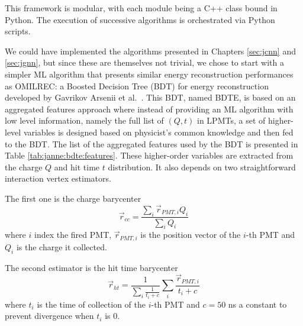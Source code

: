\documentclass[../main.tex]{subfiles}
\begin{document}
This framework is modular, with each module being a C++ class bound in Python. The execution of successive algorithms is orchestrated via Python scripts.


We could have implemented the algorithms presented in Chapters \ref{sec:jcnn} and \ref{sec:jgnn}, but since these are themselves not trivial, we chose to start with a simpler ML algorithm that presents similar energy reconstruction performances as OMILREC: a Boosted Decision Tree (BDT) for energy reconstruction developed by Gavrikov Arsenii et al.\ \cite{gavrikov_energy_2022}.
This BDT, named BDTE, is based on an aggregated features approach where instead of providing an ML algorithm with low level information, namely the full list of $(Q,t)$ in LPMTs, a set of higher-level variables is designed based on physicist's common knowledge and then fed to the BDT. The list of the aggregated features used by the BDT is presented in Table \ref{tab:janne:bdte:features}. These higher-order variables are extracted from the charge $Q$ and hit time $t$ distribution. It also depends on two straightforward interaction vertex estimators.


The first one is the charge barycenter
\begin{equation}
  \label{eq:janne:bdte:cc}
  \vec{r}_{cc} = \frac{\sum_i \vec{r}_{PMT,i} Q_i}{\sum_i Q_i}
\end{equation}
where $i$ index the fired PMT, $\vec{r}_{PMT, i}$ is the position vector of the $i$-th PMT and $Q_i$ is the charge it collected.

The second estimator is the hit time barycenter
\begin{equation}
  \label{eq:janne:bdt:cht}
  \vec{r}_{ht} = \frac{1}{\sum_i \frac{1}{t_i + c}} \sum_i \frac{\vec{r}_{PMT, i}}{t_i + c}
\end{equation}
where $t_i$ is the time of collection of the $i$-th PMT and $c = 50$ ns a constant to prevent divergence when $t_i$ is 0.
\end{document}
